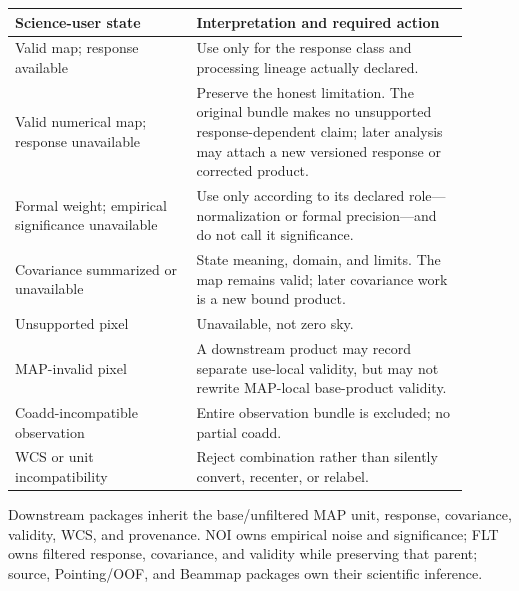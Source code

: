 \documentclass[10pt]{article}
\begin{document}
\begin{longtable}{L{0.36\linewidth}L{0.54\linewidth}}
\toprule Science-user state & Interpretation and required action \\
\midrule
Valid map; response available & Use only for the response class and processing lineage actually declared.\\
Valid numerical map; response unavailable & Preserve the honest limitation. The original bundle makes no unsupported response-dependent claim; later analysis may attach a new versioned response or corrected product.\\
Formal weight; empirical significance unavailable & Use only according to its declared role---normalization or formal precision---and do not call it significance.\\
Covariance summarized or unavailable & State meaning, domain, and limits. The map remains valid; later covariance work is a new bound product.\\
Unsupported pixel & Unavailable, not zero sky.\\
MAP-invalid pixel & A downstream product may record separate use-local validity, but may not rewrite MAP-local base-product validity.\\
Coadd-incompatible observation & Entire observation bundle is excluded; no partial coadd.\\
WCS or unit incompatibility & Reject combination rather than silently convert, recenter, or relabel.\\
\bottomrule
\end{longtable}

Downstream packages inherit the base/unfiltered MAP unit, response, covariance,
validity, WCS, and provenance. NOI owns empirical noise and significance; FLT
owns filtered response, covariance, and validity while preserving that parent;
source, Pointing/OOF, and Beammap packages own their scientific inference.

\clearpage
\end{document}
